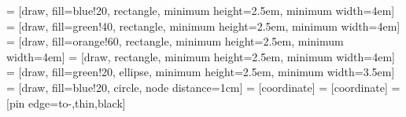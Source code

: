 
 = [draw, fill=blue!20, rectangle, minimum height=2.5em, minimum width=4em]
 = [draw, fill=green!40, rectangle, minimum height=2.5em, minimum width=4em]
 = [draw, fill=orange!60, rectangle, minimum height=2.5em, minimum width=4em]
 = [draw, rectangle, minimum height=2.5em, minimum width=4em]
 = [draw, fill=green!20, ellipse, minimum height=2.5em, minimum width=3.5em]
 = [draw, fill=blue!20, circle, node distance=1cm]
 = [coordinate]
 = [coordinate]
 = [pin edge={to-,thin,black}]